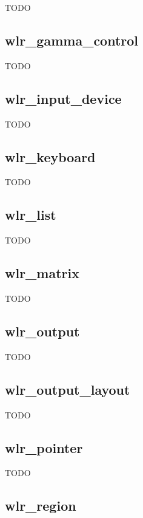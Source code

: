 \documentclass{article}
\begin{document}
TODO

\subsection{wlr_gamma_control}\label{wlr gamma control}

TODO

\subsection{wlr_input_device}\label{wlr input device}

TODO

\subsection{wlr_keyboard}\label{wlr keyboard}

TODO

\subsection{wlr_list}\label{wlr list}

TODO

\subsection{wlr_matrix}\label{wlr matrix}

TODO

\subsection{wlr_output}\label{wlr output}

TODO

\subsection{wlr_output_layout}\label{wlr output layout}

TODO

\subsection{wlr_pointer}\label{wlr pointer}

TODO

\subsection{wlr_region}\label{wlr region}
\end{document}
